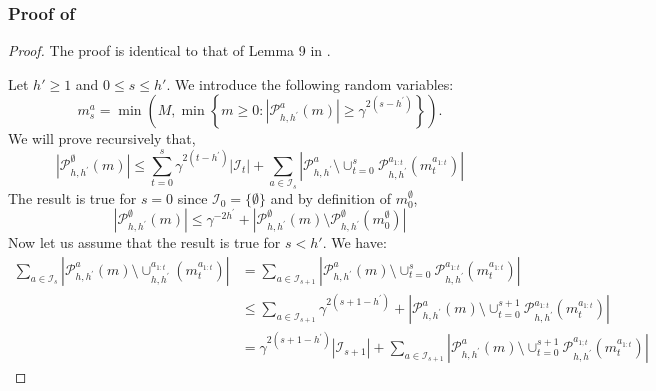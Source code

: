 \subsubsection{Proof of }
\label{sec:proof-expected_P_size}
\begin{proof}
	The proof is identical to that of Lemma 9 in \citep{Bubeck2010}.
	
	\noindent
	Let $h'\geq 1$ and $0 \leq s \leq h'$. We introduce the following random variables:
	\begin{equation*}
	m_{s}^{a}=\min \left(M, \min \left\{m \geq 0 :\left|\mathcal{P}_{h, h^{\prime}}^{a}(m)\right| \geq \gamma^{2\left(s-h^{\prime}\right)}\right\}\right).
	\end{equation*}
	We will prove recursively that,
	\begin{equation}
	\label{eq:toprove}
	\left|\mathcal{P}_{h, h^{\prime}}^{\emptyset}(m)\right| \leq \sum_{t=0}^{s} \gamma^{2\left(t-h^{\prime}\right)}\left|\mathcal{I}_{t}\right|+\sum_{a \in \mathcal{I}_{s}}\left|\mathcal{P}_{h, h^{\prime}}^{a} \setminus \cup_{t=0}^{s} \mathcal{P}_{h, h^{\prime}}^{a_{1:t}}\left(m_{t}^{a_{1:t}}\right)\right|
	\end{equation}
	The result is true for $s = 0$ since $\mathcal{I}_0 = \{\emptyset\}$ and by definition of $m^\emptyset_0$,
	\begin{equation*}
	\left|\mathcal{P}_{h, h^{\prime}}^{\emptyset}(m)\right| \leq \gamma^{-2 h^{\prime}}+\left|\mathcal{P}_{h, h^{\prime}}^{\emptyset}(m) \setminus \mathcal{P}_{h, h^{\prime}}^{\emptyset}\left(m_{0}^{\emptyset}\right)\right|
	\end{equation*}
	Now let us assume that the result is true for $s<h'$. We have:
	\begin{align*}
	\sum_{a \in \mathcal{I}_{s}}\left|\mathcal{P}_{h, h^{\prime}}^{a}(m) \setminus \cup_{h, h^{\prime}}^{a_{1 : t}}\left(m_{t}^{a_{1 : t}}\right)\right|&=\sum_{a \in \mathcal{I}_{s+1}}\left|\mathcal{P}_{h, h^{\prime}}^{a}(m) \setminus \cup_{t=0}^{s} \mathcal{P}_{h, h^{\prime}}^{a_{1 : t}}\left(m_{t}^{a_{1 : t}}\right)\right|\\
	&\leq \sum_{a \in \mathcal{I}_{s+1}} \gamma^{2\left(s+1-h^{\prime}\right)}+\left|\mathcal{P}_{h, h^{\prime}}^{a}(m) \setminus \cup_{t=0}^{s+1} \mathcal{P}_{h, h^{\prime}}^{a_{1 : t}}\left(m_{t}^{a_{1 : t}}\right)\right|\\
	&= \gamma^{2\left(s+1-h^{\prime}\right)}\left|\mathcal{I}_{s+1}\right|+\sum_{a \in \mathcal{I}_{s+1}}\left|\mathcal{P}_{h, h^{\prime}}^{a}(m) \setminus \cup_{t=0}^{s+1} \mathcal{P}_{h, h^{\prime}}^{a_{1 ; t}}\left(m_{t}^{a_{1 : t}}\right)\right|

\end{align*}
\end{proof}
